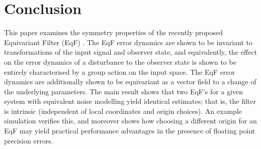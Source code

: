 \documentclass{article}
\begin{document}
\section{Conclusion}

This paper examines the symmetry properties of the recently proposed Equivariant Filter (EqF) \citep{van2020equivariant}.
The EqF error dynamics are shown to be invariant to transformations of the input signal and observer state, and equivalently, the effect on the error dynamics of a disturbance to the observer state is shown to be entirely characterised by a group action on the input space.
The EqF error dynamics are additionally shown to be equivariant as a vector field to a change of the underlying parameters.
The main result shows that two EqF's for a given system with equivalent noise modelling yield identical estimates; that is, the filter is intrinsic (independent of local coordinates and origin choices).
An example simulation verifies this, and moreover shows how choosing a different origin for an EqF may yield practical performance advantages in the presence of floating point precision errors.



    

\end{document}
